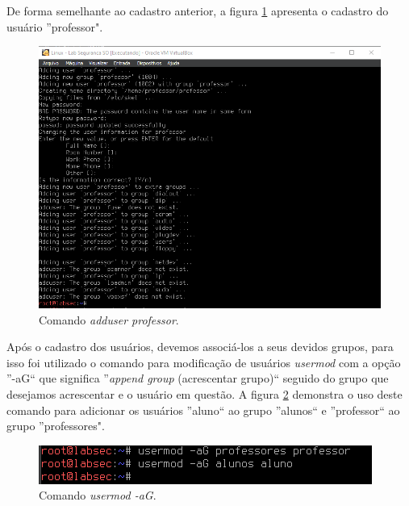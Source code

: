 \documentclass[
	12pt,				%
	oneside,   	        %
	a4paper,			%
	english,			%
	french,				%
	spanish,			%
	brazil,				%
	]{pacotes/abntex2}
\begin{document}
De forma semelhante ao cadastro anterior, a figura \ref{fig:add_prof} apresenta o cadastro do usuário ''professor".

\begin{figure}[H]
  \centering
  \includegraphics[scale=0.8]{figuras/adduser_prof.png}
  \caption{Comando \textit{adduser professor}.}
  \label{fig:add_prof}
\end{figure}

Após o cadastro dos usuários, devemos associá-los a seus devidos grupos, para isso foi utilizado o comando para modificação de usuários \textit{usermod} com a opção ''-aG`` que significa ''\textit{append group} (acrescentar grupo)`` seguido do grupo que desejamos acrescentar e o usuário em questão. A figura \ref{fig:usermod} demonstra o uso deste comando para adicionar os usuários ''aluno`` ao grupo ''alunos`` e ''professor`` ao grupo ''professores". 

\begin{figure}[H]
  \centering
  \includegraphics[scale=0.8]{figuras/usermod.png}
  \caption{Comando \textit{usermod -aG}.}
  \label{fig:usermod}
\end{figure}
\end{document}
